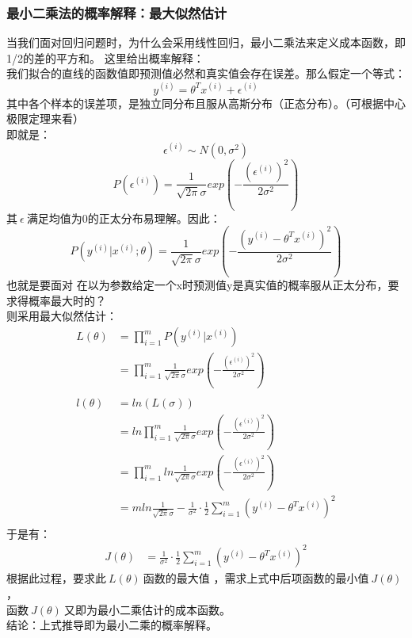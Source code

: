 \subsubsection{最小二乘法的概率解释：最大似然估计}
当我们面对回归问题时，为什么会采用线性回归，最小二乘法来定义成本函数，即1/2的差的平方和。
这里给出概率解释：\\
我们拟合的直线的函数值即预测值必然和真实值会存在误差。那么假定一个等式：\\
$$y^{(i)} = \theta^T x^{(i)}+ \epsilon^{(i)}$$
其中各个样本的误差项，是独立同分布且服从高斯分布（正态分布）。（可根据中心极限定理来看）\\
即就是：
$$\epsilon^{(i)} \sim N(0,\sigma^2)$$
$$P(\epsilon^{(i)})=\frac{1}{\sqrt{2\pi} \sigma}exp(-\frac{(\epsilon^{(i)})^2}{2 \sigma^2})$$
其$~\epsilon~$满足均值为0的正太分布易理解。因此：\\
$$P(y^{(i)}|x^{(i)};\theta)=\frac{1}{\sqrt{2\pi} \sigma}exp(- \frac{(y^{(i)}-\theta^Tx^{(i)})^2}{2\sigma^2}) $$
也就是要面对 在以为参数给定一个x时预测值y是真实值的概率服从正太分布，要求得概率最大时的？\\
则采用最大似然估计：
\begin{equation}\nonumber
\begin{split}
  L(\theta)&=\prod_{i=1}^{m}P(y^{(i)}|x^{(i)})\\
           &=\prod_{i=1}^{m}\frac{1}{\sqrt{2\pi} \sigma}exp(-\frac{(\epsilon^{(i)})^2}{2 \sigma^2})\\
~\\
  l(\theta)&=ln(L(\sigma))\\
           &=ln\prod_{i=1}^{m}\frac{1}{\sqrt{2\pi} \sigma}exp(-\frac{(\epsilon^{(i)})^2}{2 \sigma^2})\\
           &=\prod_{i=1}^{m}ln\frac{1}{\sqrt{2\pi} \sigma}exp(-\frac{(\epsilon^{(i)})^2}{2 \sigma^2})\\
           &=mln\frac{1}{\sqrt{2\pi}\sigma}-\frac{1}{\sigma^2}\cdot\frac{1}{2}\sum_{i=1}^{m}(y^{(i)}-\theta^Tx^{(i)})^2\\
\end{split}
\end{equation}
于是有：
\begin{equation}\nonumber
\begin{split}
           J(\theta)&=\frac{1}{\sigma^2}\cdot\frac{1}{2}\sum_{i=1}^{m}(y^{(i)}-\theta^Tx^{(i)})^2
\end{split}
\end{equation}
根据此过程，要求此$~L(\theta)~$函数的最大值 ，需求上式中后项函数的最小值$~J(\theta)~$，\\
函数$~J(\theta)~$又即为最小二乘估计的成本函数。\\
结论：上式推导即为最小二乘的概率解释。


